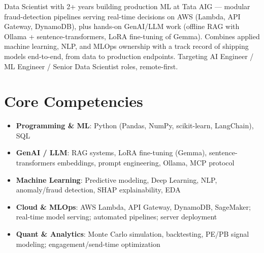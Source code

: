 \documentclass[11pt,a4paper,sans]{moderncv}
\begin{document}
\makecvtitle


\vspace{6pt}
\small{Data Scientist with 2+ years building production ML at Tata AIG --- modular fraud-detection pipelines serving real-time decisions on AWS (Lambda, API Gateway, DynamoDB), plus hands-on GenAI/LLM work (offline RAG with Ollama + sentence-transformers, LoRA fine-tuning of Gemma). Combines applied machine learning, NLP, and MLOps ownership with a track record of shipping models end-to-end, from data to production endpoints. Targeting AI Engineer / ML Engineer / Senior Data Scientist roles, remote-first.}


\section{Core Competencies}
\vspace{1pt}
\begin{itemize}

\item \textbf{Programming \& ML}: Python (Pandas, NumPy, scikit-learn, LangChain), SQL

\item \textbf{GenAI / LLM}: RAG systems, LoRA fine-tuning (Gemma), sentence-transformers embeddings, prompt engineering, Ollama, MCP protocol

\item \textbf{Machine Learning}: Predictive modeling, Deep Learning, NLP, anomaly/fraud detection, SHAP explainability, EDA

\item \textbf{Cloud \& MLOps}: AWS Lambda, API Gateway, DynamoDB, SageMaker; real-time model serving; automated pipelines; server deployment

\item \textbf{Quant \& Analytics}: Monte Carlo simulation, backtesting, PE/PB signal modeling; engagement/send-time optimization

\end{itemize}

\end{document}
